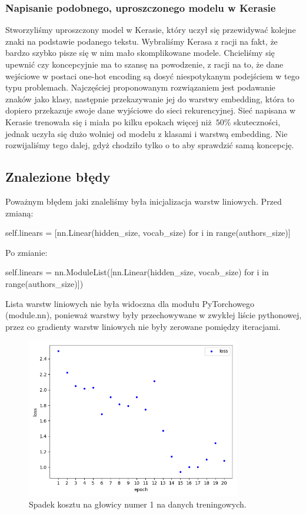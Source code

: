 \subsubsection{Napisanie podobnego, uproszczonego modelu w Kerasie}
Stworzyliśmy uproszczony model w Kerasie, który uczył się przewidywać kolejne znaki na podstawie podanego tekstu. 
Wybraliśmy Kerasa z racji na fakt, że bardzo szybko pisze się w nim mało skomplikowane modele.
Chcieliśmy się upewnić czy koncepcyjnie ma to szansę na powodzenie, z racji na to, że dane wejściowe w postaci one-hot encoding 
są dosyć niespotykanym podejściem w tego typu problemach. Najczęściej proponowanym rozwiązaniem jest podawanie znaków jako klasy, następnie 
przekazywanie jej do warstwy embedding, która to dopiero przekazuje swoje dane wyjściowe do sieci rekurencyjnej. 
Sieć napisana w Kerasie trenowała się i miała po kilku epokach więcej niż $50\%$ skuteczności, jednak uczyła się
dużo wolniej od modelu z klasami i warstwą embedding. Nie rozwijaliśmy tego dalej, gdyż chodziło tylko o to aby sprawdzić samą koncepcję.

\newpage
\subsection{Znalezione błędy}
Poważnym błędem jaki znaleliśmy była inicjalizacja warstw liniowych.
Przed zmianą:
\begin{python}
self.linears = [nn.Linear(hidden_size, vocab_size) for i in range(authors_size)]

\end{python} 
Po zmianie:
\begin{python}
self.linears = nn.ModuleList([nn.Linear(hidden_size, vocab_size) for i in range(authors_size)])

\end{python} 

Lista warstw liniowych nie była widoczna dla modułu PyTorchowego (module.nn), ponieważ warstwy były przechowywane
w zwykłej liście pythonowej, przez co gradienty warstw liniowych nie były zerowane pomiędzy iteracjami.

\begin{figure}[H]
	\centering
	\includegraphics[height=7cm]{./images/loss_decrease.png}
	\caption{Spadek kosztu na głowicy numer 1 na danych treningowych.}
	\label{fig:test5}
\end{figure}

